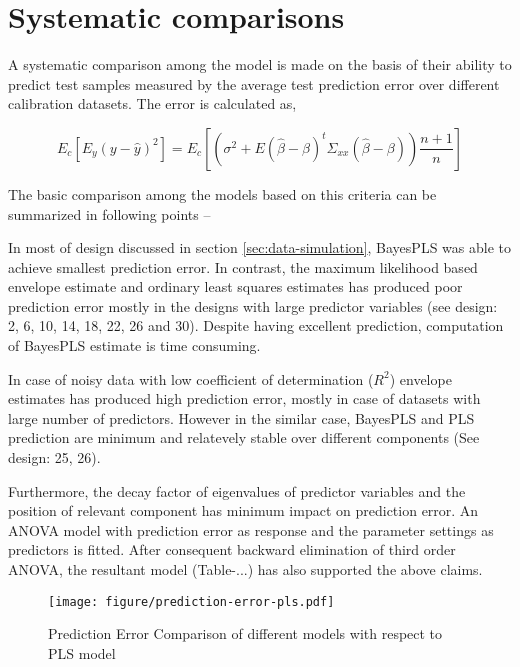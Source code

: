 \documentclass[a4paper, 11pt]{article}
\begin{document}
\section{Systematic comparisons}
A systematic comparison among the model is made on the basis of their ability to predict test samples measured by the average test prediction error over different calibration datasets. The error is calculated as,

\begin{equation*}
    E_c\left[E_y\left(y - \hat{y}\right)^2\right] =
    E_c\left[\left(\sigma^2 + E\left(\hat{\beta} - \beta\right)^t\Sigma_{xx}\left(\hat{\beta} - \beta\right)\right)\frac{n+1}{n}\right]
\end{equation*}

The basic comparison among the models based on this criteria can be summarized in following points --

In most of design discussed in section \ref{sec:data-simulation}, BayesPLS was able to achieve smallest prediction error. In contrast, the maximum likelihood based envelope estimate and ordinary least squares estimates has produced poor prediction error mostly in the designs with large predictor variables (see design: 2, 6, 10, 14, 18, 22, 26 and 30). Despite having excellent prediction, computation of BayesPLS estimate is time consuming.

In case of noisy data with low coefficient of determination ($R^2$) envelope estimates has produced high prediction error, mostly in case of datasets with large number of predictors. However in the similar case, BayesPLS and PLS prediction are minimum and relatevely stable over different components (See design: 25, 26). 

Furthermore, the decay factor of eigenvalues of predictor variables and the position of relevant component has minimum impact on prediction error. An ANOVA model with prediction error as response and the parameter settings as predictors is fitted. After consequent backward elimination of third order ANOVA, the resultant model (Table-...) has also supported the above claims.

\begin{figure}[H]
  \centering
  \texttt{[image: figure/prediction-error-pls.pdf]}
  \caption{Prediction Error Comparison of different models with respect to PLS model}
  \label{fig:pred-error-plot}
\end{figure}

\end{document}
